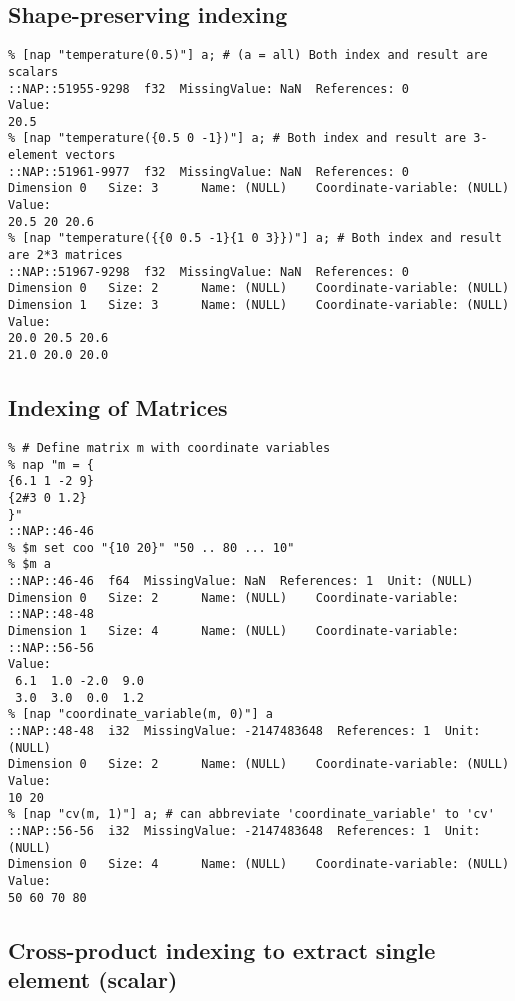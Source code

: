 \subsection{Shape-preserving indexing}

    \begin{verbatim}
% [nap "temperature(0.5)"] a; # (a = all) Both index and result are scalars
::NAP::51955-9298  f32  MissingValue: NaN  References: 0
Value:
20.5
% [nap "temperature({0.5 0 -1})"] a; # Both index and result are 3-element vectors
::NAP::51961-9977  f32  MissingValue: NaN  References: 0
Dimension 0   Size: 3      Name: (NULL)    Coordinate-variable: (NULL)
Value:
20.5 20 20.6
% [nap "temperature({{0 0.5 -1}{1 0 3}})"] a; # Both index and result are 2*3 matrices
::NAP::51967-9298  f32  MissingValue: NaN  References: 0
Dimension 0   Size: 2      Name: (NULL)    Coordinate-variable: (NULL)
Dimension 1   Size: 3      Name: (NULL)    Coordinate-variable: (NULL)
Value:
20.0 20.5 20.6
21.0 20.0 20.0
\end{verbatim}

\subsection{Indexing of Matrices}

    \begin{verbatim}
% # Define matrix m with coordinate variables
% nap "m = {
{6.1 1 -2 9}
{2#3 0 1.2}
}"
::NAP::46-46
% $m set coo "{10 20}" "50 .. 80 ... 10"
% $m a
::NAP::46-46  f64  MissingValue: NaN  References: 1  Unit: (NULL)
Dimension 0   Size: 2      Name: (NULL)    Coordinate-variable: ::NAP::48-48
Dimension 1   Size: 4      Name: (NULL)    Coordinate-variable: ::NAP::56-56
Value:
 6.1  1.0 -2.0  9.0
 3.0  3.0  0.0  1.2
% [nap "coordinate_variable(m, 0)"] a
::NAP::48-48  i32  MissingValue: -2147483648  References: 1  Unit: (NULL)
Dimension 0   Size: 2      Name: (NULL)    Coordinate-variable: (NULL)
Value:
10 20
% [nap "cv(m, 1)"] a; # can abbreviate 'coordinate_variable' to 'cv'
::NAP::56-56  i32  MissingValue: -2147483648  References: 1  Unit: (NULL)
Dimension 0   Size: 4      Name: (NULL)    Coordinate-variable: (NULL)
Value:
50 60 70 80
\end{verbatim}

\subsection{Cross-product indexing to extract single element (scalar)}


